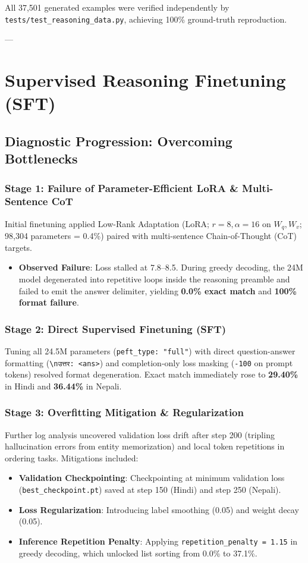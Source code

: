\documentclass[11pt,a4paper]{article}
\begin{document}
All 37,501 generated examples were verified independently by \texttt{tests/test\_reasoning\_data.py}, achieving 100\% ground-truth reproduction.

---

\section{Supervised Reasoning Finetuning (SFT)}

\subsection{Diagnostic Progression: Overcoming Bottlenecks}

\subsubsection{Stage 1: Failure of Parameter-Efficient LoRA \& Multi-Sentence CoT}
Initial finetuning applied Low-Rank Adaptation (LoRA; $r=8, \alpha=16$ on $W_q, W_v$; 98,304 parameters = 0.4\%) paired with multi-sentence Chain-of-Thought (CoT) targets.
\begin{itemize}[noitemsep]
    \item \textbf{Observed Failure}: Loss stalled at 7.8--8.5. During greedy decoding, the 24M model degenerated into repetitive loops inside the reasoning preamble and failed to emit the answer delimiter, yielding \textbf{0.0\% exact match} and \textbf{100\% format failure}.
\end{itemize}

\subsubsection{Stage 2: Direct Supervised Finetuning (SFT)}
Tuning all 24.5M parameters (\texttt{peft\_type: "full"}) with direct question-answer formatting (\texttt{\textbackslash nउत्तर: <ans>}) and completion-only loss masking (\texttt{-100} on prompt tokens) resolved format degeneration. Exact match immediately rose to \textbf{29.40\%} in Hindi and \textbf{36.44\%} in Nepali.

\subsubsection{Stage 3: Overfitting Mitigation \& Regularization}
Further log analysis uncovered validation loss drift after step 200 (tripling hallucination errors from entity memorization) and local token repetitions in ordering tasks. Mitigations included:
\begin{itemize}[noitemsep]
    \item \textbf{Validation Checkpointing}: Checkpointing at minimum validation loss (\texttt{best\_checkpoint.pt}) saved at step 150 (Hindi) and step 250 (Nepali).
    \item \textbf{Loss Regularization}: Introducing label smoothing (0.05) and weight decay (0.05).
    \item \textbf{Inference Repetition Penalty}: Applying \texttt{repetition\_penalty = 1.15} in greedy decoding, which unlocked list sorting from 0.0\% to 37.1\%.
\end{itemize}
\end{document}
